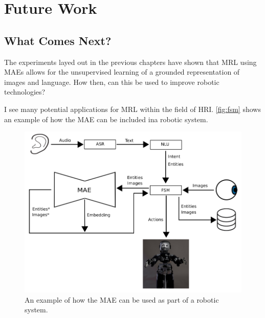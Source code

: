 
\chapter{Future Work} %

\label{Chapter8} %



\section{What Comes Next?}
The experiments layed out in the previous chapters have shown that MRL using MAEs allows for the unsupervised learning of a grounded representation of images and language. How then, can this be used to improve robotic technologies?

I see many potential applications for \ac{MRL} within the field of \ac{HRI}. \autoref{fig:fsm} shows an example of how the \ac{MAE} can be included ina robotic system.


\begin{figure}
\centering
\includegraphics[width=\textwidth]{Figs/futureWork/fsm.png}
\caption{An example of how the \ac{MAE} can be used as part of a robotic system.}
\label{fig:fsm}
\end{figure}

